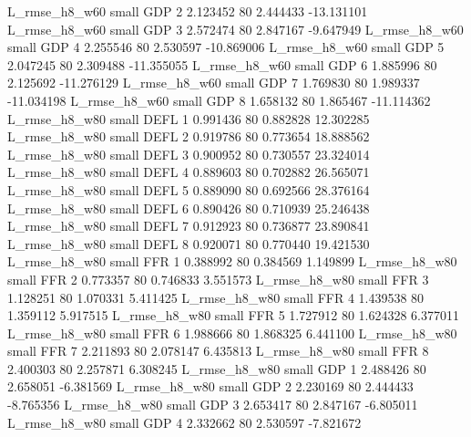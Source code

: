 L_rmse_h8_w60      small      GDP                 2 2.123452 80       2.444433         -13.131101
 L_rmse_h8_w60      small      GDP                 3 2.572474 80       2.847167          -9.647949
 L_rmse_h8_w60      small      GDP                 4 2.255546 80       2.530597         -10.869006
 L_rmse_h8_w60      small      GDP                 5 2.047245 80       2.309488         -11.355055
 L_rmse_h8_w60      small      GDP                 6 1.885996 80       2.125692         -11.276129
 L_rmse_h8_w60      small      GDP                 7 1.769830 80       1.989337         -11.034198
 L_rmse_h8_w60      small      GDP                 8 1.658132 80       1.865467         -11.114362
 L_rmse_h8_w80      small     DEFL                 1 0.991436 80       0.882828          12.302285
 L_rmse_h8_w80      small     DEFL                 2 0.919786 80       0.773654          18.888562
 L_rmse_h8_w80      small     DEFL                 3 0.900952 80       0.730557          23.324014
 L_rmse_h8_w80      small     DEFL                 4 0.889603 80       0.702882          26.565071
 L_rmse_h8_w80      small     DEFL                 5 0.889090 80       0.692566          28.376164
 L_rmse_h8_w80      small     DEFL                 6 0.890426 80       0.710939          25.246438
 L_rmse_h8_w80      small     DEFL                 7 0.912923 80       0.736877          23.890841
 L_rmse_h8_w80      small     DEFL                 8 0.920071 80       0.770440          19.421530
 L_rmse_h8_w80      small      FFR                 1 0.388992 80       0.384569           1.149899
 L_rmse_h8_w80      small      FFR                 2 0.773357 80       0.746833           3.551573
 L_rmse_h8_w80      small      FFR                 3 1.128251 80       1.070331           5.411425
 L_rmse_h8_w80      small      FFR                 4 1.439538 80       1.359112           5.917515
 L_rmse_h8_w80      small      FFR                 5 1.727912 80       1.624328           6.377011
 L_rmse_h8_w80      small      FFR                 6 1.988666 80       1.868325           6.441100
 L_rmse_h8_w80      small      FFR                 7 2.211893 80       2.078147           6.435813
 L_rmse_h8_w80      small      FFR                 8 2.400303 80       2.257871           6.308245
 L_rmse_h8_w80      small      GDP                 1 2.488426 80       2.658051          -6.381569
 L_rmse_h8_w80      small      GDP                 2 2.230169 80       2.444433          -8.765356
 L_rmse_h8_w80      small      GDP                 3 2.653417 80       2.847167          -6.805011
 L_rmse_h8_w80      small      GDP                 4 2.332662 80       2.530597          -7.821672
